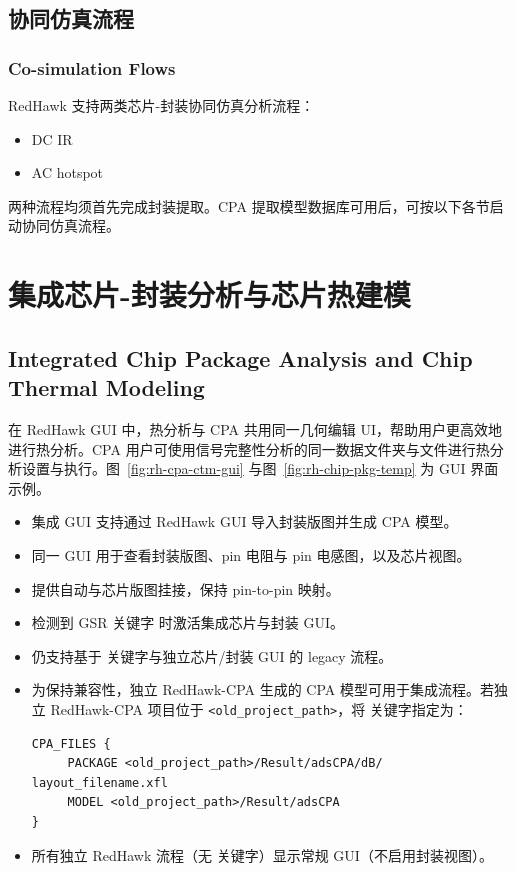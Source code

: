 \subsection{协同仿真流程}
\subsubsection*{Co-simulation Flows}

RedHawk 支持两类芯片-封装协同仿真分析流程：
\begin{itemize}
  \item DC IR
  \item AC hotspot
\end{itemize}

两种流程均须首先完成封装提取。CPA 提取模型数据库可用后，可按以下各节启动协同仿真流程。

\section{集成芯片-封装分析与芯片热建模}
\subsection*{Integrated Chip Package Analysis and Chip Thermal Modeling}

在 RedHawk GUI 中，热分析与 CPA 共用同一几何编辑 UI，帮助用户更高效地进行热分析。CPA 用户可使用信号完整性分析的同一数据文件夹与文件进行热分析设置与执行。图~\ref{fig:rh-cpa-ctm-gui} 与图~\ref{fig:rh-chip-pkg-temp} 为 GUI 界面示例。

\begin{itemize}
  \item 集成 GUI 支持通过 RedHawk GUI 导入封装版图并生成 CPA 模型。
  \item 同一 GUI 用于查看封装版图、pin 电阻与 pin 电感图，以及芯片视图。
  \item 提供自动与芯片版图挂接，保持 pin-to-pin 映射。
  \item 检测到 GSR 关键字  时激活集成芯片与封装 GUI。
  \item 仍支持基于  关键字与独立芯片/封装 GUI 的 legacy 流程。
  \item 为保持兼容性，独立 RedHawk-CPA 生成的 CPA 模型可用于集成流程。若独立 RedHawk-CPA 项目位于 \texttt{<old\_project\_path>}，将  关键字指定为：
\begin{lstlisting}
CPA_FILES {
     PACKAGE <old_project_path>/Result/adsCPA/dB/
layout_filename.xfl
     MODEL <old_project_path>/Result/adsCPA
}
\end{lstlisting}
  \item 所有独立 RedHawk 流程（无  关键字）显示常规 GUI（不启用封装视图）。
\end{itemize}

